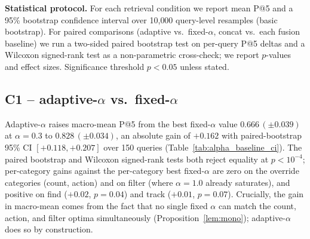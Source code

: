 ﻿\documentclass[conference]{IEEEtran}
\theoremstyle{definition}
\begin{document}
\textbf{Statistical protocol.} For each retrieval condition we report mean P@5 and a 95\% bootstrap confidence interval over 10{,}000 query-level resamples (basic bootstrap). For paired comparisons (adaptive vs.\ fixed-$\alpha$, concat vs.\ each fusion baseline) we run a two-sided paired bootstrap test on per-query P@5 deltas and a Wilcoxon signed-rank test as a non-parametric cross-check; we report $p$-values and effect sizes. Significance threshold $p<0.05$ unless stated.

\subsection{C1 -- adaptive-\texorpdfstring{$\alpha$}{alpha} vs.\ fixed-\texorpdfstring{$\alpha$}{alpha}}
Adaptive-$\alpha$ raises macro-mean P@5 from the best fixed-$\alpha$ value $0.666\,(\pm0.039)$ at $\alpha{=}0.3$ to $0.828\,(\pm0.034)$, an absolute gain of $+0.162$ with paired-bootstrap 95\% CI $[+0.118,+0.207]$ over 150 queries (Table~\ref{tab:alpha_baseline_ci}). The paired bootstrap and Wilcoxon signed-rank tests both reject equality at $p<10^{-4}$; per-category gains against the per-category best fixed-$\alpha$ are zero on the override categories (count, action) and on filter (where $\alpha{=}1.0$ already saturates), and positive on find ($+0.02$, $p=0.04$) and track ($+0.01$, $p=0.07$). Crucially, the gain in macro-mean comes from the fact that no single fixed $\alpha$ can match the count, action, and filter optima simultaneously (Proposition~\ref{lem:mono}); adaptive-$\alpha$ does so by construction.

\begin{table}[!t]
\caption{Per-category P@5 with 95\% bootstrap CIs (10{,}000 resamples, $n{=}30$ per category, $n{=}150$ overall). $\Delta$ is the per-query mean of (adaptive $-$ per-category best-fixed-$\alpha$); $p$ is two-sided paired bootstrap. The bottom row compares the best single fixed-$\alpha$ macro-mean ($\alpha{=}0.3$) against adaptive-$\alpha$.}
\label{tab:alpha_baseline_ci}
\centering
\scriptsize
\setlength{\tabcolsep}{3pt}
\end{table}
\end{document}
